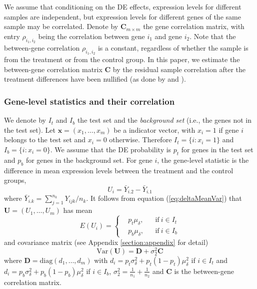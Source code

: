 \documentclass[11pt, a4paper]{article}
\begin{document}
	
	We assume that conditioning on the DE effects, expression levels for different samples are independent, but expression levels for different genes of the same sample may be correlated. Denote by $\bm C_{m \times m}$ the gene correlation matrix, with entry $\rho_{i_1, i_2}$ being the correlation between gene $i_1$ and gene $i_2$. Note that the between-gene correlation $\rho_{i_1, i_2}$ is a constant, regardless of whether the sample is from the treatment or from the control group. In this paper, we estimate the between-gene correlation matrix $\bm C$ by the residual sample correlation after the treatment differences have been nullified (as done by \cite{efron2007correlation} and \cite{wu2012camera}).
	
	\subsubsection*{Gene-level statistics and their correlation}\label{subsubsection:genelevelcorrelation}
	
	We denote by $I_t$ and $I_b$ the test set and the \textit{background set} (i.e., the genes not in the test set). Let $\bm x = (x_1, \ldots, x_m)$ be a indicator vector, with $x_i=1$ if gene $i$ belongs to the test set and $x_i=0$ otherwise. Therefore $I_t = \{i: x_i =1\}$ and $I_b = \{i: x_i =0\}$. We assume that the DE probability is $p_t$ for genes in the test set and $p_b$ for genes in the background set. For gene $i$, the gene-level statistic is the difference in mean expression levels between the treatment and the control groups,
	\begin{equation}\label{eq:genelevelstat}
		U_i=\bar{Y}_{i.2}-\bar{Y}_{i.1}
	\end{equation} 
	where $\bar{Y}_{i.k}= \sum_{j=1}^{n_k}Y_{ijk}/n_k$. It follows from equation (\ref{eq:deltaMeanVar}) that $\bm U = (U_1, \ldots, U_m)$ has mean
	\begin{equation}\label{eq:expectation}
		E(U_i) = \left \{
		\begin{aligned}
			&p_t\mu_{\delta}, && \text{if}\ i \in I_t \\
			&p_b\mu_{\delta}, && \text{if}\ i \in I_b
		\end{aligned} \right.
	\end{equation} 
	and covariance matrix (see Appendix \ref{section:appendix} for detail) 
	\begin{equation}\label{eq:variance}
		\text{Var}(\bm U) = \bm D  + \sigma_2^2\bm C
	\end{equation}
	where $\bm D = \text{diag}(d_1, \ldots, d_m)$ with $d_i = p_t\sigma_{\delta}^2 + p_t(1-p_t)\mu_{\delta}^2$ if $i\in I_t$ and $d_i =p_b\sigma_{\delta}^2 + p_b(1-p_b)\mu_{\delta}^2$ if $i\in I_b$,  $\sigma_2^2 =\frac{1}{n_1} + \frac{1}{n_2} $ and $\bm C$ is the between-gene correlation matrix. 
	
\end{document}
